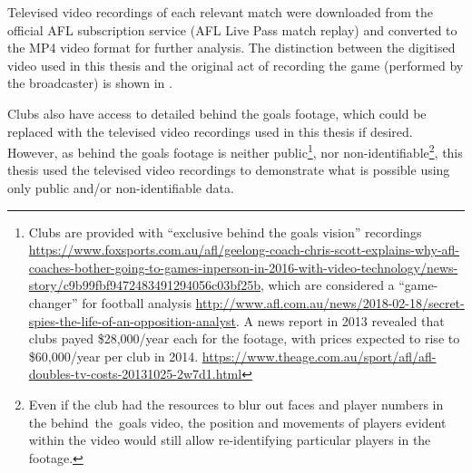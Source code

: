 

Televised video recordings of each relevant match were downloaded from the official AFL subscription service (AFL Live Pass match replay) and converted to the MP4 video format for further analysis. The distinction between the digitised video used in this thesis and the original act of recording the game (performed by the broadcaster) is shown in .

Clubs also have access to detailed behind the goals footage, which could be replaced with the televised video recordings used in this thesis if desired. However, as behind the goals footage is neither public\footnote{Clubs are provided with ``exclusive behind the goals vision'' recordings \url{https://www.foxsports.com.au/afl/geelong-coach-chris-scott-explains-why-afl-coaches-bother-going-to-games-inperson-in-2016-with-video-technology/news-story/c9b99fbf9472483491294056c03bf25b}, which are considered a ``game-changer'' for football analysis \url{http://www.afl.com.au/news/2018-02-18/secret-spies-the-life-of-an-opposition-analyst}. A news report in 2013 revealed that clubs payed \$28,000/year each for the footage, with prices expected to rise to \$60,000/year per club in 2014. \url{https://www.theage.com.au/sport/afl/afl-doubles-tv-costs-20131025-2w7d1.html}}, nor non-identifiable\footnote{Even if the club had the resources to blur out faces and player numbers in the behind~the~goals video, the position and movements of players evident within the video would still allow re-identifying particular players in the footage.}, this thesis used the televised video recordings to demonstrate what is possible using only public and/or non-identifiable data.



